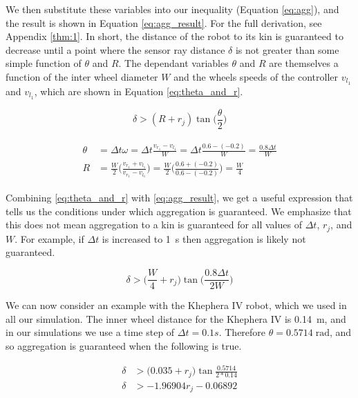 \documentclass[conference]{IEEEtran}
\begin{document}
  We then substitute these variables into our inequality (Equation \ref{eq:agg}), and the result is shown in Equation \ref{eq:agg_result}. For the full derivation, see Appendix \ref{thm:1}. In short, the distance of the robot to its kin is guaranteed to decrease until a point where the sensor ray distance $\delta$ is not greater than some simple function of $\theta$ and $R$. The dependant variables $\theta$ and $R$ are themselves a function of the inter wheel diameter $W$ and the wheels speeds of the controller $v_{l_1}$ and $v_{l_1}$, which are shown in Equation \ref{eq:theta_and_r}.

  \begin{equation} \label{eq:agg_result}
    \delta > (R + r_j)\tan\bigg(\frac{\theta}{2}\bigg)
  \end{equation}

  \begin{align}
    \begin{split} \label{eq:theta_and_r}
      \theta &= \Delta t\omega = \Delta t \frac{v_{r_1} - v_{l_1}}{W} = \Delta t \frac{0.6 - (-0.2)}{W} = \frac{0.8\Delta t}{W} \\
      R &= \frac{W}{2}\bigg(\frac{v_{r_1} + v_{l_1}}{v_{r_1} - v_{l_1}}\bigg) = \frac{W}{2}\bigg(\frac{0.6 + (-0.2)}{0.6 - (-0.2)}\bigg) = \frac{W}{4}
    \end{split}
  \end{align}

  Combining \ref{eq:theta_and_r} with \ref{eq:agg_result}, we get a useful expression that tells us the conditions under which aggregation is guaranteed. We emphasize that this does not mean aggregation to a kin is guaranteed for all values of $\Delta t$, $r_j$, and $W$. For example, if $\Delta t$ is increased to \SI{1}{\second} then aggregation is likely not guaranteed.

  \begin{equation*} \label{eq:agg_final_result}
    \delta > \bigg(\frac{W}{4} + r_j\bigg)\tan\bigg(\frac{0.8\Delta t}{2W}\bigg)
  \end{equation*}

  We can now consider an example with the Khephera IV robot, which we used in all our simulation. The inner wheel distance for the Khephera IV is \SI{0.14}{\meter}, and in our simulations we use a time step of $\Delta t = 0.1s$. Therefore $\theta = 0.5714\;\text{rad}$, and so aggregation is guaranteed when the following is true.

  \begin{equation} \label{eq:khephera_agg}
    \begin{split}
      \delta &> \bigg(0.035 + r_j\bigg)\tan\frac{0.5714}{2*0.14} \\
      \delta &> -1.96904 r_j - 0.06892
    \end{split}
  \end{equation}
\end{document}
